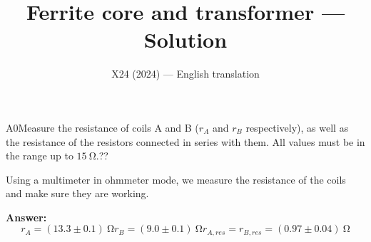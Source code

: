 \documentclass[11pt,a4paper]{article}
\title{\textbf{Ferrite core and transformer --- Solution}}
\author{\normalsize X24 (2024) — English translation}
\date{}
\begin{document}
\maketitle\vspace{-0.5em}
\begin{solcard}{A0}{Measure the resistance of coils A and B ($r_A$ and $r_B$ respectively), as well as the resistance of the resistors connected in series with them. All values must be in the range up to $15~\mathrm{\Omega}$.}{??}

Using a multimeter in ohmmeter mode, we measure the resistance of the coils and make sure they are working.

\par\smallskip\noindent\textbf{Answer:} $$r_A=(13.3\pm0.1)~\mathrm{\Omega}r_B=(9.0\pm0.1)~\mathrm{\Omega}r_{A,res}=r_{B,res}=(0.97\pm0.04)~\mathrm{\Omega}$$
\end{solcard}
\end{document}
